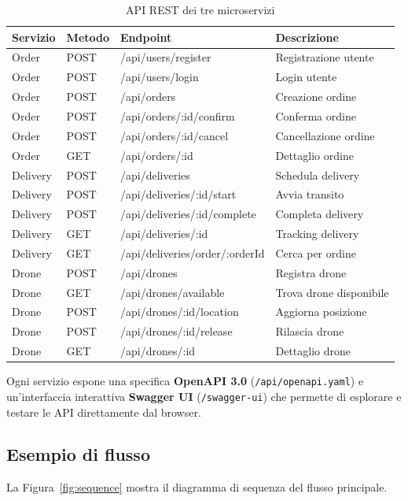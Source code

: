 \documentclass[12pt,a4paper]{article}
\begin{document}
\begin{table}[H]
\centering
\small
\begin{tabularx}{\textwidth}{lllX}
\toprule
\textbf{Servizio} & \textbf{Metodo} & \textbf{Endpoint} & \textbf{Descrizione} \\
\midrule
Order & POST & /api/users/register & Registrazione utente \\
Order & POST & /api/users/login & Login utente \\
Order & POST & /api/orders & Creazione ordine \\
Order & POST & /api/orders/:id/confirm & Conferma ordine \\
Order & POST & /api/orders/:id/cancel & Cancellazione ordine \\
Order & GET & /api/orders/:id & Dettaglio ordine \\
\midrule
Delivery & POST & /api/deliveries & Schedula delivery \\
Delivery & POST & /api/deliveries/:id/start & Avvia transito \\
Delivery & POST & /api/deliveries/:id/complete & Completa delivery \\
Delivery & GET & /api/deliveries/:id & Tracking delivery \\
Delivery & GET & /api/deliveries/order/:orderId & Cerca per ordine \\
\midrule
Drone & POST & /api/drones & Registra drone \\
Drone & GET & /api/drones/available & Trova drone disponibile \\
Drone & POST & /api/drones/:id/location & Aggiorna posizione \\
Drone & POST & /api/drones/:id/release & Rilascia drone \\
Drone & GET & /api/drones/:id & Dettaglio drone \\
\bottomrule
\end{tabularx}
\caption{API REST dei tre microservizi}
\end{table}

Ogni servizio espone una specifica \textbf{OpenAPI 3.0} (\texttt{/api/openapi.yaml}) e un'interfaccia interattiva \textbf{Swagger UI} (\texttt{/swagger-ui}) che permette di esplorare e testare le API direttamente dal browser.

\subsection{Esempio di flusso}

La Figura~\ref{fig:sequence} mostra il diagramma di sequenza del flusso principale.
\end{document}

